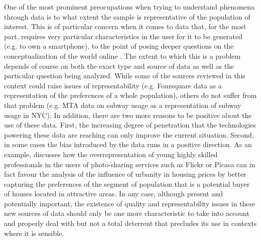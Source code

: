 \documentclass[12pt]{article}
\begin{document}
One of the most prominent preocupations when trying to understand phenomena
through data is to what extent the sample is representative of the population
of interest. This is of particular concern when it comes to data that, for the
most part, requires very
particular characteristics in the user for it to be generated (e.g. to own a
smartphone), to the point of posing deeper questions on the
conceptualization of the world online \citep{grahamzook2013augmented}. The extent to which
this is a problem depends of course on both
the exact type and source of data as well as the particular question being
analyzed. While some of the sources reviewed in this context could raise
issues of representability (e.g. Foursquare data as a representation of the
preferences of a whole population), others do not suffer from that problem
(e.g. MTA data on subway usage as a representation of subway usage
in NYC).
In addition, there are two more reasons to be positive about the use of these
data. First, the increasing degree of penetration that the technologies powering
these data are reaching can only improve the current situation.
Second, in some cases the bias introduced by the data runs in a positive
direction. As an example, \cite{urbanity_photo2012} discusses how the
overrepresentation of young highly skilled professionals in
the users of photo-sharing services such as Flickr or Picasa can in fact
favour the analysis of the influence of urbanity in housing prices by
better capturing the preferences of the segment of population that is a potential
buyer of houses located in attractive areas.
In any case, although present and potentially important, the existence of
quality and representability issues in these new sources of data should only
be one more characteristic to take into account and properly deal with but not
a total deterrent that precludes its use in contexts where it is sensible.
\end{document}
